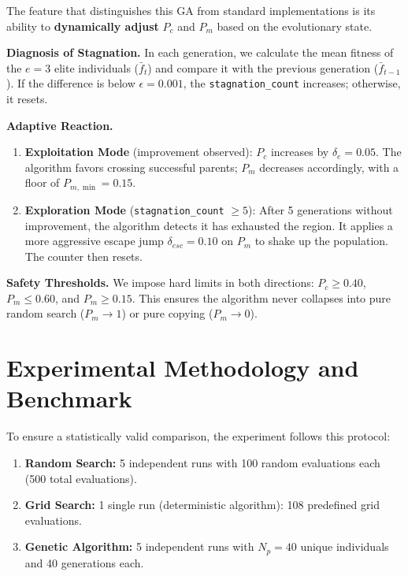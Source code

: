 \documentclass[12pt, a4paper]{article}
\begin{document}
The feature that distinguishes this GA from standard implementations is its ability to
\textbf{dynamically adjust} $P_c$ and $P_m$ based on the evolutionary state.

\textbf{Diagnosis of Stagnation.} In each generation, we calculate the mean fitness of
the $e=3$ elite individuals ($\bar{f}_t$) and compare it with the previous generation
($\bar{f}_{t-1}$). If the difference is below $\epsilon = 0.001$, the
\texttt{stagnation\_count} increases; otherwise, it resets.

\textbf{Adaptive Reaction.}
\begin{enumerate}[itemsep=0.3em]
  \item \textbf{Exploitation Mode} (improvement observed): $P_c$ increases by
        $\delta_e = 0.05$. The algorithm favors crossing successful parents; $P_m$
        decreases accordingly, with a floor of $P_{m,\min} = 0.15$.
  \item \textbf{Exploration Mode} (\texttt{stagnation\_count} $\geq 5$): After 5
        generations without improvement, the algorithm detects it has exhausted the
        region. It applies a more aggressive escape jump $\delta_{esc} = 0.10$ on $P_m$
        to shake up the population. The counter then resets.
\end{enumerate}

\textbf{Safety Thresholds.} We impose hard limits in both directions:
$P_c \geq 0.40$, $P_m \leq 0.60$, and $P_m \geq 0.15$. This ensures the algorithm
never collapses into pure random search ($P_m \to 1$) or pure copying ($P_m \to 0$).

\section{Experimental Methodology and Benchmark}

To ensure a statistically valid comparison, the experiment follows this protocol:

\begin{enumerate}[itemsep=0.3em]
  \item \textbf{Random Search:} 5 independent runs with 100 random evaluations each
        (500 total evaluations).
  \item \textbf{Grid Search:} 1 single run (deterministic algorithm): 108 predefined
        grid evaluations.
  \item \textbf{Genetic Algorithm:} 5 independent runs with $N_p = 40$ unique individuals
        and 40 generations each.
\end{enumerate}
\end{document}
